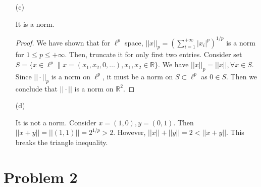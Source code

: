 \documentclass[12pt]{article}
\begin{document}
\begin{enumerate}
\begin{proof}
\end{proof}

\item [(c)]

It is a norm.

\begin{proof}

We have shown that for $\ell^p$ space, $||x||_p = (\sum_{i=1}^{+\infty} |x_i|^p)^{1/p} $ is a norm for $1\leqslant p \leqslant +\infty$. Then, truncate it for only first two entries. Consider set $S = \{ x \in \ell^p \| x = (x_1, x_2, 0, \dots),  x_1, x_2 \in \mathbb{R}\}$. We have $||x||_p = ||x||, \forall x\in S$. Since $||\cdot||_p$ is a norm on $\ell^p$, it must be a norm on $S\subset \ell^p$ as $0\in S$. Then we conclude that $||\cdot||$ is a norm on $\mathbb{R}^2$.

\end{proof}

\item [(d)]

It is not a norm. Consider $x = (1, 0), y = (0, 1)$. Then $||x+y|| = ||(1,1)|| = 2^{1/p} > 2$. However, $||x|| + ||y|| = 2 < ||x + y||$. This breaks the triangle inequality.


\end{enumerate}

\section*{Problem 2}
\end{document}
